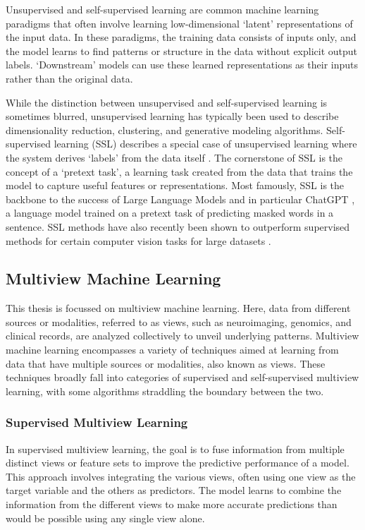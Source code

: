 Unsupervised and self-supervised learning are common machine learning paradigms that often involve learning low-dimensional `latent' representations of the input data. In these paradigms, the training data consists of inputs only, and the model learns to find patterns or structure in the data without explicit output labels. `Downstream' models can use these learned representations as their inputs rather than the original data.

While the distinction between unsupervised and self-supervised learning is sometimes blurred, unsupervised learning has typically been used to describe dimensionality reduction, clustering, and generative modeling algorithms. Self-supervised learning (SSL) describes a special case of unsupervised learning where the system derives `labels' from the data itself \citep{balestriero2023cookbook}. The cornerstone of SSL is the concept of a `pretext task', a learning task created from the data that trains the model to capture useful features or representations. Most famously, SSL is the backbone to the success of Large Language Models \citep{vaswani2017attention} and in particular ChatGPT \citep{chatgpt}, a language model trained on a pretext task of predicting masked words in a sentence. SSL methods have also recently been shown to outperform supervised methods for certain computer vision tasks for large datasets \citep{goyal2019scaling}.


\subsection{Multiview Machine Learning}
This thesis is focussed on multiview machine learning.
Here, data from different sources or modalities, referred to as \gls{views}, such as neuroimaging, genomics, and clinical records, are analyzed collectively to unveil underlying patterns.
Multiview machine learning encompasses a variety of techniques aimed at learning from data that have multiple sources or modalities, also known as \gls{views}.
These techniques broadly fall into categories of supervised and self-supervised multiview learning, with some algorithms straddling the boundary between the two.

\subsubsection{Supervised Multiview Learning}

In supervised multiview learning, the goal is to fuse information from multiple distinct views or feature sets to improve the predictive performance of a model. This approach involves integrating the various views, often using one view as the target variable and the others as predictors. The model learns to combine the information from the different views to make more accurate predictions than would be possible using any single view alone.

